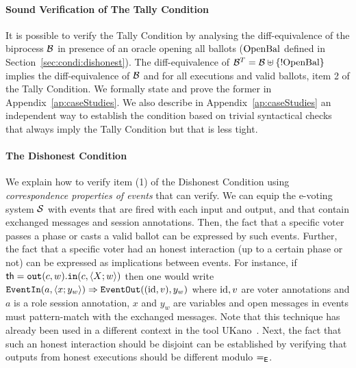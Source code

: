 \paragraph{\textbf{Sound Verification of The Tally Condition}}
It is possible to verify the Tally Condition by analysing the diff-equivalence
of the biprocess $\biproc$ in presence of an oracle opening all ballots
(\ie $\openAllBal$ defined in Section~\ref{sec:condi:dishonest}).
The diff-equivalence of $\biproc^T = \biproc\uplus\{!\openAllBal\}$ implies the diff-equivalence
of $\biproc$ and
for all executions and valid ballots, item 2 of the Tally Condition.
We formally state and prove the former
in Appendix~\ref{ap:caseStudies}. We also describe in Appendix~\ref{ap:caseStudies}
an independent way to establish the condition based on
trivial syntactical checks that always imply the Tally Condition but that is less tight.

\paragraph{\textbf{The Dishonest Condition}}
We explain how to verify item (1) of the 
Dishonest Condition using {\em correspondence properties of events} that \proverif can verify.
%
We can equip the e-voting system $\S$ with events that are fired with
each input and output, and that contain exchanged messages
and session annotations.
Then, the fact that a specific voter passes a phase or casts a valid
ballot can be expressed by such events.
Further, the fact that a specific voter had an honest interaction (up to a certain phase or not)
can be expressed as implications between events.
For instance, if $\th=\Out(c,w).\In(c,\langle X; w\rangle)$ then one would write
$
\mathtt{EventIn}(a,\langle x; y_w\rangle)\Rightarrow
\mathtt{EventOut}((\id,v),y_w)$ where $\id,v$ are voter annotations
and $a$ is a role session annotation, $x$ and $y_w$ are variables and open messages in
events must pattern-match with the exchanged messages.
Note that this technique has already been used in a different context
in the tool UKano~\cite{HBD-sp16}.
Next, the fact that such an honest interaction should be disjoint can be established
by verifying that outputs from honest executions should be different modulo $\theo$.

